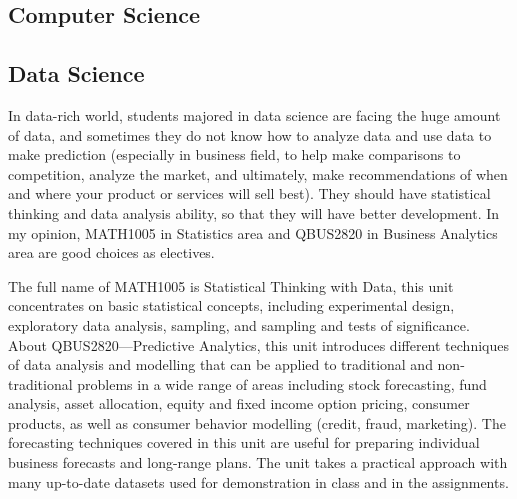 \documentclass{article}
\begin{document}
\subsection{Computer Science}


\subsection{Data Science}

In data-rich world, students majored in data science are facing the huge amount of data, and sometimes they do not know how to analyze data and use data to make prediction (especially in business field, to help make comparisons to competition, analyze the market, and ultimately, make recommendations of when and where your product or services will sell best). They should have statistical thinking and data analysis ability, so that they will have better development. In my opinion, MATH1005 in Statistics area and QBUS2820 in Business Analytics area are good choices as electives.

The full name of MATH1005 is Statistical Thinking with Data, this unit concentrates on basic statistical concepts, including experimental design, exploratory data analysis, sampling, and sampling and tests of significance. About QBUS2820—Predictive Analytics, this unit introduces different techniques of data analysis and modelling that can be applied to traditional and non-traditional problems in a wide range of areas including stock forecasting, fund analysis, asset allocation, equity and fixed income option pricing, consumer products, as well as consumer behavior modelling (credit, fraud, marketing). The forecasting techniques covered in this unit are useful for preparing individual business forecasts and long-range plans. The unit takes a practical approach with many up-to-date datasets used for demonstration in class and in the assignments.
\end{document}
